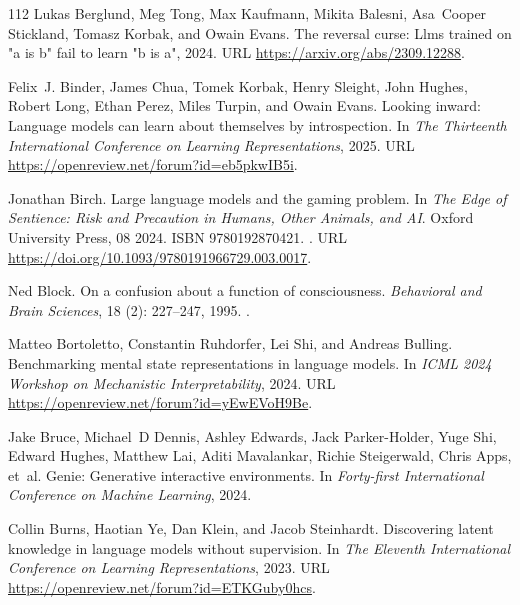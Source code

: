 \begin{thebibliography}{112}
Lukas Berglund, Meg Tong, Max Kaufmann, Mikita Balesni, Asa~Cooper Stickland, Tomasz Korbak, and Owain Evans.
\newblock The reversal curse: Llms trained on "a is b" fail to learn "b is a", 2024.
\newblock URL \url{https://arxiv.org/abs/2309.12288}.

Felix~J. Binder, James Chua, Tomek Korbak, Henry Sleight, John Hughes, Robert Long, Ethan Perez, Miles Turpin, and Owain Evans.
\newblock Looking inward: Language models can learn about themselves by introspection.
\newblock In \emph{The Thirteenth International Conference on Learning Representations}, 2025.
\newblock URL \url{https://openreview.net/forum?id=eb5pkwIB5i}.

Jonathan Birch.
\newblock Large language models and the gaming problem.
\newblock In \emph{The Edge of Sentience: Risk and Precaution in Humans, Other Animals, and AI}. Oxford University Press, 08 2024.
\newblock ISBN 9780192870421.
\newblock {}.
\newblock URL \url{https://doi.org/10.1093/9780191966729.003.0017}.

Ned Block.
\newblock On a confusion about a function of consciousness.
\newblock \emph{Behavioral and Brain Sciences}, 18 (2): 227–247, 1995.
\newblock {}.

Matteo Bortoletto, Constantin Ruhdorfer, Lei Shi, and Andreas Bulling.
\newblock Benchmarking mental state representations in language models.
\newblock In \emph{ICML 2024 Workshop on Mechanistic Interpretability}, 2024.
\newblock URL \url{https://openreview.net/forum?id=yEwEVoH9Be}.

Jake Bruce, Michael~D Dennis, Ashley Edwards, Jack Parker-Holder, Yuge Shi, Edward Hughes, Matthew Lai, Aditi Mavalankar, Richie Steigerwald, Chris Apps, et~al.
\newblock Genie: Generative interactive environments.
\newblock In \emph{Forty-first International Conference on Machine Learning}, 2024.

Collin Burns, Haotian Ye, Dan Klein, and Jacob Steinhardt.
\newblock Discovering latent knowledge in language models without supervision.
\newblock In \emph{The Eleventh International Conference on Learning Representations}, 2023.
\newblock URL \url{https://openreview.net/forum?id=ETKGuby0hcs}.


\end{thebibliography}
